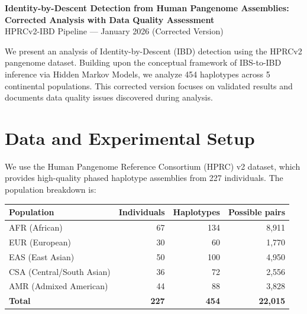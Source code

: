 \documentclass[11pt]{article}
\begin{document}
\begin{center}
\textbf{\Large Identity-by-Descent Detection from Human Pangenome Assemblies:\\Corrected Analysis with Data Quality Assessment}\\[0.6em]
{\small HPRCv2-IBD Pipeline --- January 2026 (Corrected Version)}
\end{center}

\vspace{1em}

\begin{center}
\end{center}

\vspace{1em}

We present an analysis of Identity-by-Descent (IBD) detection using the HPRCv2 pangenome dataset. Building upon the conceptual framework of IBS-to-IBD inference via Hidden Markov Models, we analyze 454 haplotypes across 5 continental populations. This corrected version focuses on validated results and documents data quality issues discovered during analysis.

\section{Data and Experimental Setup}

We use the Human Pangenome Reference Consortium (HPRC) v2 dataset, which provides high-quality phased haplotype assemblies from 227 individuals. The population breakdown is:

\begin{table}[H]
\centering
\begin{tabular}{@{}lrrr@{}}
\textbf{Population} & \textbf{Individuals} & \textbf{Haplotypes} & \textbf{Possible pairs} \\
\midrule
AFR (African) & 67 & 134 & 8,911 \\
EUR (European) & 30 & 60 & 1,770 \\
EAS (East Asian) & 50 & 100 & 4,950 \\
CSA (Central/South Asian) & 36 & 72 & 2,556 \\
AMR (Admixed American) & 44 & 88 & 3,828 \\
\midrule
\textbf{Total} & \textbf{227} & \textbf{454} & \textbf{22,015} \\
\end{tabular}
\end{table}
\end{document}
